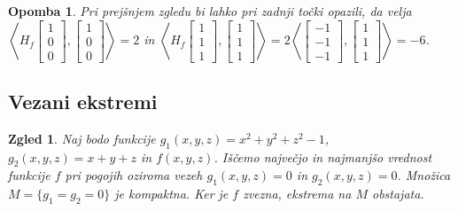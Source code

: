 \documentclass[10pt, a4paper]{article}
\newtheorem*{opomba}{Opomba}
\newtheorem{zgled}{Zgled}[section]
\begin{document}
\begin{opomba}
    Pri prejšnjem zgledu bi lahko pri zadnji točki opazili, da velja $\left\langle H_f \begin{bmatrix}
        1\\0\\0
    \end{bmatrix}, \begin{bmatrix}
        1\\0\\0
    \end{bmatrix} \right\rangle = 2$ in
    $\left\langle H_f \begin{bmatrix}
        1\\1\\1
    \end{bmatrix}, \begin{bmatrix}
        1\\1\\1
    \end{bmatrix} \right\rangle = 2
    \left\langle \begin{bmatrix}
        -1\\-1\\-1
    \end{bmatrix}, \begin{bmatrix}
        1\\1\\1
    \end{bmatrix} \right\rangle = -6$.
\end{opomba}

\subsection{Vezani ekstremi}

\begin{zgled}
    Naj bodo funkcije $g_1 (x,y,z) = x^2 + y^2 + z^2 - 1$, $g_2 (x,y,z) = x + y + z$ 
    in $f(x,y,z)$. Iščemo največjo in najmanjšo vrednost funkcije $f$ pri pogojih oziroma vezeh
    $g_1 (x,y,z) = 0$ in $g_2 (x,y,z) = 0$. Množica $M = \{g_1 = g_2 = 0\}$ je kompaktna.
    Ker je $f$ zvezna, ekstrema na $M$ obstajata.
\end{zgled}
\end{document}
